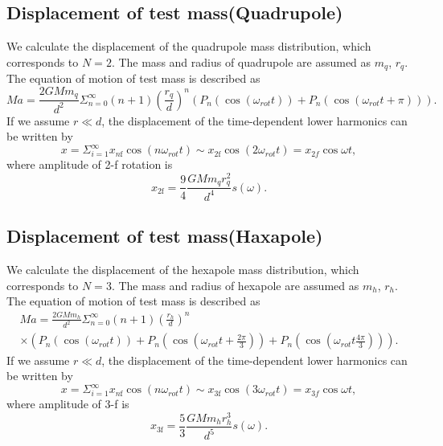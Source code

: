 \documentclass[12pt]{iopart}
\begin{document}
\subsection{Displacement of test mass(Quadrupole)} \label{Quad}
We calculate the displacement of the quadrupole mass distribution, which corresponds to $N=2$.
The mass and radius of quadrupole are assumed as $m_q$, $r_q$. 
The equation of motion of test mass is described as
\begin{equation}
Ma=\frac{2GMm_q}{d^2}\Sigma^{\infty}_{n=0}(n+1) \left( \frac{r_q}{d} \right)^n \left( P_n\left(\cos{\left(\omega_{rot} t \right)}\right) + P_n\left(\cos{\left(\omega_{rot} t +\pi \right)}\right) \right).
\end{equation} 
If we assume $r \ll d$, the displacement of the time-dependent lower harmonics can be written by 
\begin{equation}
x=\Sigma_{i=1}^{\infty}x_{n\mathrm{f}}\cos(n\omega_{rot} t)\sim x_{2\mathrm{f}}\cos(2\omega_{rot} t)=x_{2f}\cos{\omega t},
\end{equation}
where amplitude of 2-f rotation is
\begin{equation}
x_{2\mathrm{f}}=\frac{9}{4}\frac{GMm_{q}r_{q}^2}{d^4}s(\omega). \label{2f}
\end{equation}

\subsection{Displacement of test mass(Haxapole)} \label{Hexa}
We calculate the displacement of the hexapole mass distribution, which corresponds to $N=3$.
The mass and radius of hexapole are assumed as $m_h$, $r_h$. 
The equation of motion of test mass is described as
\begin{eqnarray}
Ma = \frac{2GMm_h}{d^2}\Sigma^{\infty}_{n=0}(n+1) \left( \frac{r_h}{d} \right)^n \\
\times \left( P_n\left(\cos{\left(\omega_{rot} t \right)}\right) + P_n\left(\cos{\left(\omega_{rot} t+\frac{2\pi}{3} \right)} \right) + P_n\left(\cos{\left(\omega_{rot} t \frac{4\pi}{3} \right) }\right) \right).
\end{eqnarray} 
If we assume $r \ll d$, the displacement of the time-dependent lower harmonics can be written by 
\begin{equation}
x=\Sigma_{i=1}^{\infty}x_{n\mathrm{f}}\cos(n\omega_{rot} t)\sim  x_{3\mathrm{f}}\cos(3\omega_{rot} t)=x_{3f}\cos{\omega t},
\end{equation}
where amplitude of 3-f is
\begin{equation}
 x_{3\mathrm{f}}=\frac{5}{3}\frac{GMm_{h}r_{h}^3}{d^5}s(\omega). \label{3f}
\end{equation}
\end{document}
